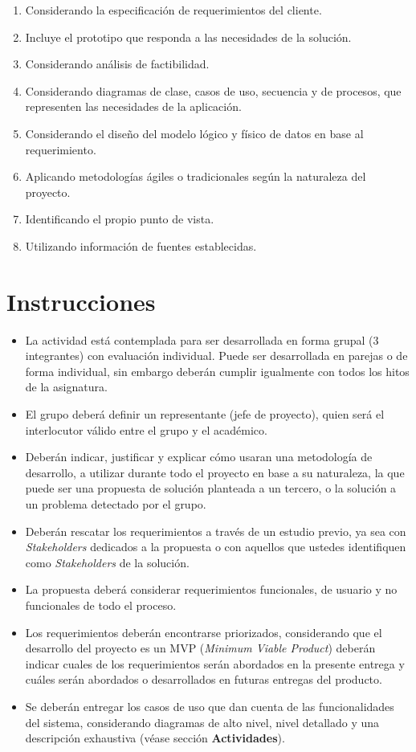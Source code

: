 \documentclass[]{article}
\begin{document}
\begin{enumerate}
    \item Considerando la especificación de requerimientos del cliente.
    \item Incluye el prototipo que responda a las necesidades de la solución.
    \item Considerando análisis de factibilidad.
    \item Considerando diagramas de clase, casos de uso, secuencia y de procesos, que representen las necesidades de la aplicación.
    \item Considerando el diseño del modelo lógico y físico de datos en base al requerimiento.
    \item Aplicando metodologías ágiles o tradicionales según la naturaleza del proyecto.
    \item Identificando el propio punto de vista.
    \item Utilizando información de fuentes establecidas.
\end{enumerate}

\section{Instrucciones}

\begin{itemize}
    \item La actividad está contemplada para ser desarrollada en forma grupal (3 integrantes) con evaluación individual. Puede ser desarrollada en parejas o 
    de forma individual, sin embargo deberán cumplir igualmente con todos los hitos de la asignatura.
    \item El grupo deberá definir un representante (jefe de proyecto), quien será el interlocutor válido entre el grupo y el académico.
    \item Deberán indicar, justificar y explicar cómo usaran una metodología de desarrollo, a utilizar durante todo el proyecto en base a su naturaleza, la que 
    puede ser una propuesta de solución planteada a un tercero, o la solución a un problema detectado por el grupo.
    \item Deberán rescatar los requerimientos a través de un estudio previo, ya sea con \textit{Stakeholders} dedicados a la propuesta o con aquellos que ustedes
    identifiquen como \textit{Stakeholders} de la solución.
    \item La propuesta deberá considerar requerimientos funcionales, de usuario y no funcionales de todo el proceso.
    \item Los requerimientos deberán encontrarse priorizados, considerando que el desarrollo del proyecto es un MVP (\textit{Minimum Viable Product}) deberán indicar 
    cuales de los requerimientos serán abordados en la presente entrega y cuáles serán abordados o desarrollados en futuras entregas del producto.
    \item Se deberán entregar los casos de uso que dan cuenta de las funcionalidades del sistema, considerando diagramas de alto nivel, nivel detallado y una descripción
    exhaustiva (véase sección \textbf{Actividades}).
\end{itemize}
\end{document}
